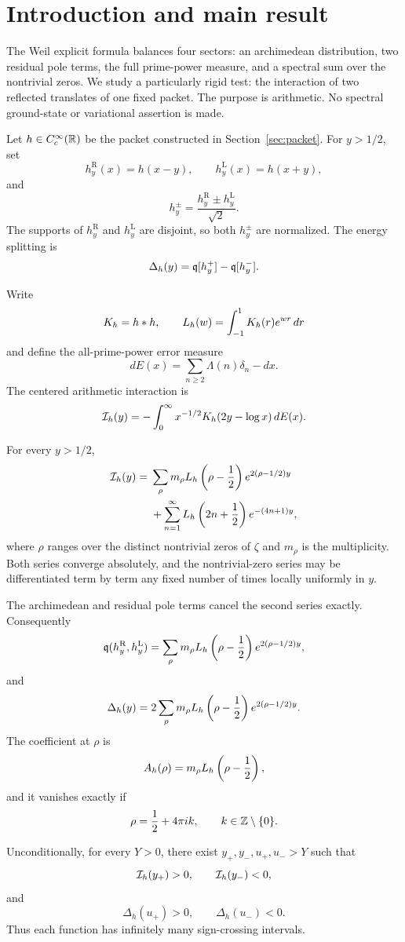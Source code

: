\section{Introduction and main result}

The Weil explicit formula balances four sectors: an archimedean
distribution, two residual pole terms, the full prime-power measure, and a
spectral sum over the nontrivial zeros.  We study a particularly rigid test:
the interaction of two reflected translates of one fixed packet.  The
purpose is arithmetic.  No spectral ground-state or variational assertion is
made.

Let \(h\in C_c^\infty(\mathbb R)\) be the packet constructed in
Section~\ref{sec:packet}.  For \(y>1/2\), set
\[
h_y^{\mathrm R}(x)=h(x-y),\qquad
h_y^{\mathrm L}(x)=h(x+y),
\]
and
\[
h_y^\pm=\frac{h_y^{\mathrm R}\pm h_y^{\mathrm L}}{\sqrt2}.
\]
The supports of \(h_y^{\mathrm R}\) and \(h_y^{\mathrm L}\) are disjoint, so
both \(h_y^\pm\) are normalized.  The energy splitting is
\[
\Delta_h(y)=\mathfrak q[h_y^+]-\mathfrak q[h_y^-].
\]

Write
\[
K_h=h*h,\qquad
L_h(w)=\int_{-1}^{1}K_h(r)e^{wr}\,dr
\]
and define the all-prime-power error measure
\[
dE(x)=\sum_{n\ge2}\Lambda(n)\delta_n-dx.
\]
The centered arithmetic interaction is
\[
\mathcal I_h(y)=
-\int_0^\infty x^{-1/2}K_h(2y-\log x)\,dE(x).
\]

\begin{theorem}
\label{thm:main}
For every \(y>1/2\),
\begin{align}
\mathcal I_h(y)
={}&
\sum_{\rho}m_\rho
L_h\left(\rho-\frac12\right)e^{2(\rho-1/2)y}
\notag\\
&+
\sum_{n=1}^{\infty}
L_h\left(2n+\frac12\right)e^{-(4n+1)y},
\label{eq:I-expansion}
\end{align}
where \(\rho\) ranges over the distinct nontrivial zeros of \(\zeta\) and
\(m_\rho\) is the multiplicity.  Both series converge absolutely, and the
nontrivial-zero series may be differentiated term by term any fixed number
of times locally uniformly in \(y\).

The archimedean and residual pole terms cancel the second series exactly.
Consequently
\begin{equation}
\mathfrak q(h_y^{\mathrm R},h_y^{\mathrm L})
=
\sum_\rho m_\rho
L_h\left(\rho-\frac12\right)e^{2(\rho-1/2)y},
\label{eq:zero-only}
\end{equation}
and
\begin{equation}
\Delta_h(y)=
2\sum_\rho m_\rho
L_h\left(\rho-\frac12\right)e^{2(\rho-1/2)y}.
\label{eq:delta-zero-only}
\end{equation}
The coefficient at \(\rho\) is
\[
A_h(\rho)=m_\rho L_h\left(\rho-\frac12\right),
\]
and it vanishes exactly if
\[
\rho=\frac12+4\pi i k,\qquad k\in\mathbb Z\setminus\{0\}.
\]

Unconditionally, for every \(Y>0\), there exist
\(y_+,y_-,u_+,u_->Y\) such that
\[
\mathcal I_h(y_+)>0,\qquad \mathcal I_h(y_-)<0,
\]
and
\[
\Delta_h(u_+)>0,\qquad \Delta_h(u_-)<0.
\]
Thus each function has infinitely many sign-crossing intervals.
\end{theorem}

